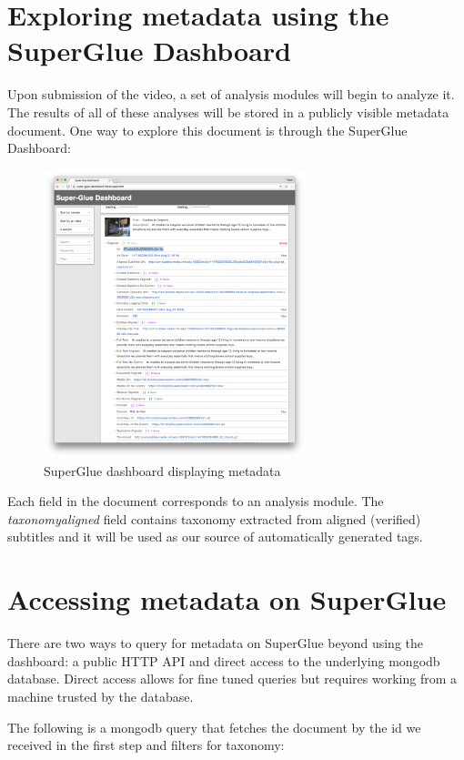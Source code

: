 \section{Exploring metadata using the SuperGlue Dashboard}

Upon submission of the video, a set of analysis modules will begin to analyze it. The results of all of these analyses will be stored in a publicly visible metadata document. One way to explore this document is through the SuperGlue Dashboard:

\begin{figure}[thpb]
  \centering
  \includegraphics[width=3in]{figures/super-glue-dashboard.png}
  \caption{SuperGlue dashboard displaying metadata}
  \label{fig_superglue_dashboard}
\end{figure}

Each field in the document corresponds to an analysis module. The \textit{taxonomyaligned} field contains taxonomy extracted from aligned (verified) subtitles and it will be used as our source of automatically generated tags. 

\section{Accessing metadata on SuperGlue}

There are two ways to query for metadata on SuperGlue beyond using the dashboard: a public HTTP API and direct access to the underlying mongodb\cite{mongodb} database. Direct access allows for fine tuned queries but requires working from a machine trusted by the database. 

The following is a mongodb query that fetches the document by the id we received in the first step and filters for taxonomy:

